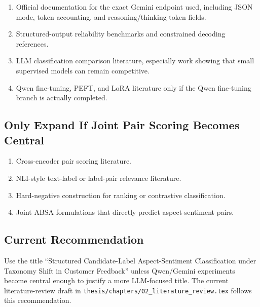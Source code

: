 \begin{enumerate}
  \item Official documentation for the exact Gemini endpoint used, including JSON mode, token accounting, and reasoning/thinking token fields.
  \item Structured-output reliability benchmarks and constrained decoding references.
  \item LLM classification comparison literature, especially work showing that small supervised models can remain competitive.
  \item Qwen fine-tuning, PEFT, and LoRA literature only if the Qwen fine-tuning branch is actually completed.
\end{enumerate}

\subsection*{Only Expand If Joint Pair Scoring Becomes Central}

\begin{enumerate}
  \item Cross-encoder pair scoring literature.
  \item NLI-style text-label or label-pair relevance literature.
  \item Hard-negative construction for ranking or contrastive classification.
  \item Joint ABSA formulations that directly predict aspect-sentiment pairs.
\end{enumerate}

\subsection*{Current Recommendation}

Use the title ``Structured Candidate-Label Aspect-Sentiment Classification under Taxonomy Shift in Customer Feedback'' unless Qwen/Gemini experiments become central enough to justify a more LLM-focused title. The current literature-review draft in \texttt{thesis/chapters/02\_literature\_review.tex} follows this recommendation.
